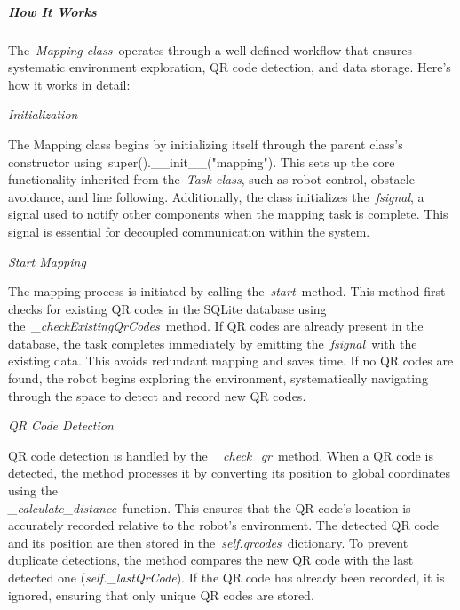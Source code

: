 \documentclass[../../main]{subfiles}
\begin{document}
\subparagraph{How It Works}

The~\emph{Mapping class}~operates through a well-defined workflow that
ensures systematic environment exploration, QR code detection, and data
storage. Here's how it works in detail:

\emph{Initialization}

The Mapping class begins by initializing itself through the parent
class's constructor using~super().\_\_init\_\_("mapping"). This sets up
the core functionality inherited from the~\emph{Task class}, such as
robot control, obstacle avoidance, and line following. Additionally, the
class initializes the~\emph{fsignal}, a signal used to notify other
components when the mapping task is complete. This signal is essential
for decoupled communication within the system.

\emph{Start Mapping}

The mapping process is initiated by calling the~\emph{start}~method.
This method first checks for existing QR codes in the SQLite database
using the~\emph{\_checkExistingQrCodes}~method. If QR codes are already
present in the database, the task completes immediately by emitting
the~\emph{fsignal~}with the existing data. This avoids redundant mapping
and saves time. If no QR codes are found, the robot begins exploring the
environment, systematically navigating through the space to detect and
record new QR codes.

\emph{QR Code Detection}

QR code detection is handled by the~\emph{\_check\_qr}~method. When a QR
code is detected, the method processes it by converting its position to
global coordinates using the \\ \emph{\_calculate\_distance}~function. This
ensures that the QR code's location is accurately recorded relative to
the robot's environment. The detected QR code and its position are then
stored in the~\emph{self.qrcodes}~dictionary. To prevent duplicate
detections, the method compares the new QR code with the last detected
one (\emph{self.\_lastQrCode}). If the QR code has already been
recorded, it is ignored, ensuring that only unique QR codes are stored.
\end{document}
